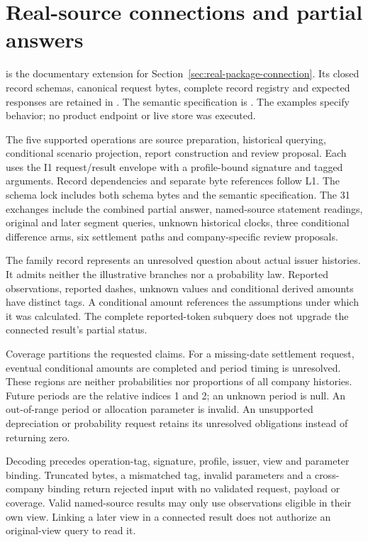 \section{Real-source connections and partial answers}
\label{sec:real-package-reference}

 is the documentary extension for
Section~\ref{sec:real-package-connection}. Its closed record schemas,
canonical request bytes, complete record registry and expected responses are
retained in
.
The semantic specification is
.
The examples specify behavior; no product endpoint or live store was executed.

The five supported operations are source preparation, historical querying,
conditional scenario projection, report construction and review proposal.
Each uses the I1 request/result envelope with a profile-bound signature and
tagged arguments. Record dependencies and separate byte references follow L1.
The schema lock includes both schema bytes and the semantic specification.
The 31 exchanges include the combined partial answer, named-source statement
readings, original and later segment queries, unknown historical clocks, three
conditional difference arms, six settlement paths and company-specific review
proposals.

The family record represents an unresolved question about actual issuer
histories. It admits neither the illustrative branches nor a probability law.
Reported observations, reported dashes, unknown values and conditional derived
amounts have distinct tags. A conditional amount references the assumptions
under which it was calculated. The complete reported-token subquery does not
upgrade the connected result's partial status.

Coverage partitions the requested claims. For a missing-date settlement
request, eventual conditional amounts are completed and period timing is
unresolved. These regions are neither probabilities nor proportions of all
company histories. Future periods are the relative indices 1 and 2; an unknown
period is null. An out-of-range period or allocation parameter is invalid.
An unsupported depreciation or probability request retains its unresolved
obligations instead of returning zero.

Decoding precedes operation-tag, signature, profile, issuer, view and parameter
binding. Truncated bytes, a mismatched tag, invalid parameters and a
cross-company binding return rejected input with no validated request, payload
or coverage. Valid named-source results may only use observations eligible in
their own view. Linking a later view in a connected result does not authorize
an original-view query to read it.

